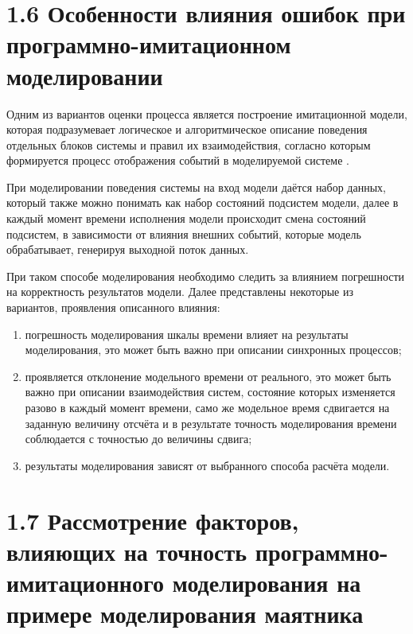 {\begin{onehalfspace}
 
	


     
	\section*{\large{1.6 Особенности влияния ошибок при программно-имитационном моделировании}}
	
	Одним из вариантов оценки процесса является построение имитационной модели, которая подразумевает логическое и алгоритмическое описание поведения отдельных блоков системы и правил их взаимодействия, согласно которым формируется процесс отображения событий в моделируемой системе \cite{sans26}.


 При моделировании поведения системы на вход модели даётся набор данных, который также можно понимать как набор состояний подсистем модели, далее в каждый момент времени исполнения модели происходит смена состояний подсистем, в зависимости от влияния внешних событий, которые модель обрабатывает, генерируя выходной поток данных.
 
 
 При таком способе моделирования необходимо следить за влиянием погрешности на корректность результатов модели. Далее представлены некоторые из вариантов, проявления описанного влияния:
 
	\begin{enumerate} 
 
		\item погрешность моделирования шкалы времени влияет на результаты моделирования, это может быть важно при описании синхронных процессов;
		\item проявляется отклонение модельного времени от реального, это может быть важно при описании взаимодействия систем, состояние которых изменяется разово в каждый момент времени, само же модельное время сдвигается на заданную величину отсчёта и в результате точность моделирования времени соблюдается с точностью до величины сдвига;
		\item результаты моделирования зависят от выбранного способа расчёта модели.

	\end{enumerate} 


 
	
	
	
	\section*{\large{1.7 Рассмотрение факторов, влияющих на точность программно-имитационного моделирования на примере моделирования маятника}}
	

\end{onehalfspace}}
